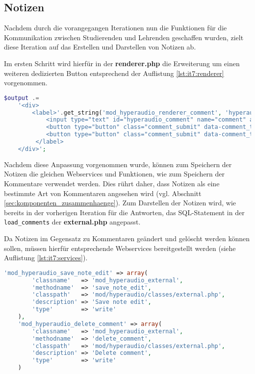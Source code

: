 \subsection{Notizen}
Nachdem durch die vorangegangen Iterationen nun die Funktionen für die Kommunikation zwischen Studierenden und Lehrenden geschaffen wurden, zielt diese Iteration auf das Erstellen und Darstellen von Notizen ab.

Im ersten Schritt wird hierfür in der \textbf{renderer.php} die Erweiterung um einen weiteren dedizierten Button entsprechend der Auflistung \ref{lst:it7:renderer} vorgenommen.

\begin{lstlisting}[language=php,
             linewidth=\textwidth,
             caption={Ausschnitt der \textbf{renderer.php} in der 7. Iteration},
             label={lst:it7:renderer}]
$output .=
	'<div>
		<label>'.get_string('mod_hyperaudio_renderer_comment', 'hyperaudio').':
			<input type="text" id="hyperaudio_comment" name="comment" autocomplete="off"/>
			<button type="button" class="comment_submit" data-comment_type="'.CommentType::Comment.'">'.get_string('mod_hyperaudio_renderer_submit_comment', 'hyperaudio').'</button>
			<button type="button" class="comment_submit" data-comment_type="'.CommentType::Note.'">'.get_string('mod_hyperaudio_renderer_submit_note', 'hyperaudio').'</button>
		 </label>
	</div>';
\end{lstlisting}

Nachdem diese Anpassung vorgenommen wurde, können zum Speichern der Notizen die gleichen Webservices und Funktionen, wie zum Speichern der Kommentare verwendet werden. Dies rührt daher, dass Notizen als eine bestimmte Art von Kommentaren angesehen wird (vgl. Abschnitt \ref{sec:komponenten_zusammenhaenge}). Zum Darstellen der Notizen wird, wie bereits in der vorherigen Iteration für die Antworten, das SQL-Statement in der \texttt{load_comments} der \textbf{external.php} angepasst.

Da Notizen im Gegensatz zu Kommentaren geändert und gelöscht werden können sollen, müssen hierfür entsprechende Webservices bereitgestellt werden (siehe Auflistung \ref{lst:it7:services}).

\begin{lstlisting}[language=php,
             linewidth=\textwidth,
             caption={Ausschnitt der \textbf{services.php} in der 7. Iteration},
             label={lst:it7:services}]
'mod_hyperaudio_save_note_edit' => array(
        'classname'   => 'mod_hyperaudio_external',
        'methodname'  => 'save_note_edit',
        'classpath'   => 'mod/hyperaudio/classes/external.php',
        'description' => 'Save note edit',
        'type'        => 'write'
    ),
    'mod_hyperaudio_delete_comment' => array(
        'classname'   => 'mod_hyperaudio_external',
        'methodname'  => 'delete_comment',
        'classpath'   => 'mod/hyperaudio/classes/external.php',
        'description' => 'Delete comment',
        'type'        => 'write'
    )
\end{lstlisting}

